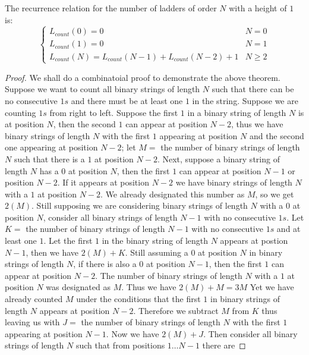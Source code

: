    \begin{theorem}
       The recurrence relation for the number of ladders of order $N$ with a height of $1$ is:
      \[   \left\{
        \begin{array}{ll}
        L_{count}(0) = 0 & N = 0 \\
        L_{count}(1) = 0 & N=1 \\
        L_{count}(N) = L_{count}(N-1) + L_{count}(N-2) + 1 & N \geq 2 
        \end{array} 
    \right. \]
   \end{theorem}
\begin{proof}
    We shall do a combinatoial proof to demonstrate the above theorem. Suppose we want to count all binary strings of length $N$ such that there 
    can be no consecutive $1s$ and there must be at least one $1$ in the string. Suppose we are counting $1s$ from right to left. Suppose the first $1$ in a binary string of length $N$ is at position $N$, 
    then the second $1$ can appear at position $N-2$, thus we have binary 
    strings of length $N$ with the first $1$ appearing at position $N$ and the second one appearing at position $N-2$; let $M=$ the number of binary strings of length $N$ such that there is a $1$ 
    at position $N-2$. Next, suppose a binary string of length $N$ has a $0$ at position $N$, then
    the first $1$ can appear at position $N-1$ or position $N-2$. If it appears at position $N-2$ we have binary strings of length $N$ with a $1$ at position $N-2$. 
    We already designated this number as $M$, so we get $2(M)$. 
    Still supposing we are considering binary strings of length $N$ with a $0$ at position $N$, consider all binary strings of length $N-1$ with 
    no consecutive $1s$. Let $K=$ the number of binary strings of length $N-1$ with no consecutive $1s$ and at least one $1$.
    Let the first $1$ in the binary string of length $N$ appears at postion $N-1$, then we have $2(M)+K$. Still assuming a $0$ at position $N$
    in binary strings of length $N$, if there is also a $0$ at position $N-1$, then the first $1$ can appear at position $N-2$. The number of 
    binary strings of length $N$ with a $1$ at position $N$ was designated as $M$. Thus we have $2(M)+M=3M$
    Yet we have already counted $M$ under the conditions that the first $1$ in binary strings of length $N$ appears at position $N-2$. Therefore we subtract 
    $M$ from $K$ thus leaving us with $J=$ the number of binary strings of length $N$ with the first $1$ appearing at position $N-1$. 
    Now we have $2(M)+J$. Then consider all binary strings of length $N$ such that from positions $1\dots N-1$ there are 

\end{proof}
